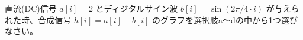 直流(DC)信号 $a[i] = 2$ とディジタルサイン波 $b[i] = \sin ( 2\pi/4 \cdot i)$ が与えられた時、合成信号  $h[i] = a[i] + b[i]$ のグラフを選択肢a〜dの中から1つ選びなさい。

